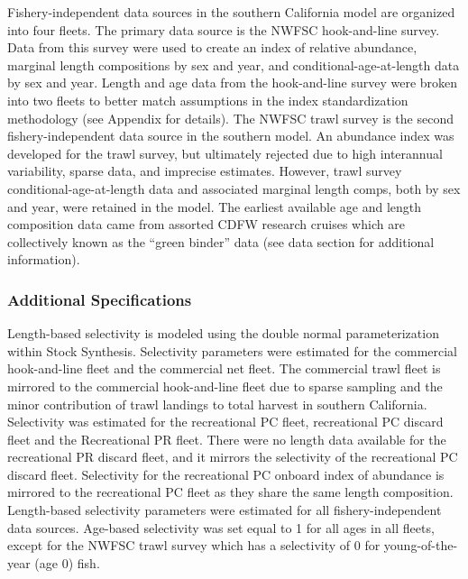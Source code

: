\documentclass[11pt,
  english,
  a4paper,
]{article}
\begin{document}
Fishery-independent data sources in the southern California model are organized into four fleets. The primary data source is the NWFSC hook-and-line survey. Data from this survey were used to create an index of relative abundance, marginal length compositions by sex and year, and conditional-age-at-length data by sex and year. Length and age data from the hook-and-line survey were broken into two fleets to better match assumptions in the index standardization methodology (see Appendix for details). The NWFSC trawl survey is the second fishery-independent data source in the southern model. An abundance index was developed for the trawl survey, but ultimately rejected due to high interannual variability, sparse data, and imprecise estimates. However, trawl survey conditional-age-at-length data and associated marginal length comps, both by sex and year, were retained in the model. The earliest available age and length composition data came from assorted CDFW research cruises which are collectively known as the ``green binder'' data (see data section for additional information).


\hypertarget{additional-specifications}{%
\subsubsection{Additional Specifications}\label{additional-specifications}}

\leavevmode\tagmcend\tagstructend

Length-based selectivity is modeled using the double normal parameterization within Stock Synthesis. Selectivity parameters were estimated for the commercial hook-and-line fleet and the commercial net fleet. The commercial trawl fleet is mirrored to the commercial hook-and-line fleet due to sparse sampling and the minor contribution of trawl landings to total harvest in southern California. Selectivity was estimated for the recreational PC fleet, recreational PC discard fleet and the Recreational PR fleet. There were no length data available for the recreational PR discard fleet, and it mirrors the selectivity of the recreational PC discard fleet. Selectivity for the recreational PC onboard index of abundance is mirrored to the recreational PC fleet as they share the same length composition. Length-based selectivity parameters were estimated for all fishery-independent data sources. Age-based selectivity was set equal to 1 for all ages in all fleets, except for the NWFSC trawl survey which has a selectivity of 0 for young-of-the-year (age 0) fish.
\end{document}
